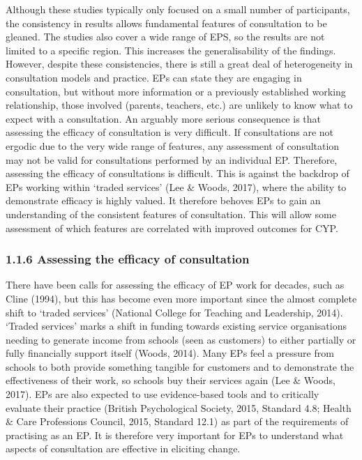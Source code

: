 \documentclass[
  english,
  man]{apa7}
\begin{document}
Although these studies typically only focused on a small number of participants, the consistency in results allows fundamental features of consultation to be gleaned. The studies also cover a wide range of EPS, so the results are not limited to a specific region. This increases the generalisability of the findings. However, despite these consistencies, there is still a great deal of heterogeneity in consultation models and practice. EPs can state they are engaging in consultation, but without more information or a previously established working relationship, those involved (parents, teachers, etc.) are unlikely to know what to expect with a consultation. An arguably more serious consequence is that assessing the efficacy of consultation is very difficult. If consultations are not ergodic due to the very wide range of features, any assessment of consultation may not be valid for consultations performed by an individual EP. Therefore, assessing the efficacy of consultations is difficult. This is against the backdrop of EPs working within `traded services' (Lee \& Woods, 2017), where the ability to demonstrate efficacy is highly valued. It therefore behoves EPs to gain an understanding of the consistent features of consultation. This will allow some assessment of which features are correlated with improved outcomes for CYP.

\hypertarget{assessing-the-efficacy-of-consultation}{%
\subsubsection{1.1.6 Assessing the efficacy of consultation}\label{assessing-the-efficacy-of-consultation}}

There have been calls for assessing the efficacy of EP work for decades, such as Cline (1994), but this has become even more important since the almost complete shift to `traded services' (National College for Teaching and Leadership, 2014). `Traded services' marks a shift in funding towards existing service organisations needing to generate income from schools (seen as customers) to either partially or fully financially support itself (Woods, 2014). Many EPs feel a pressure from schools to both provide something tangible for customers and to demonstrate the effectiveness of their work, so schools buy their services again (Lee \& Woods, 2017). EPs are also expected to use evidence-based tools and to critically evaluate their practice (British Psychological Society, 2015, Standard 4.8; Health \& Care Professions Council, 2015, Standard 12.1) as part of the requirements of practising as an EP. It is therefore very important for EPs to understand what aspects of consultation are effective in eliciting change.
\end{document}
